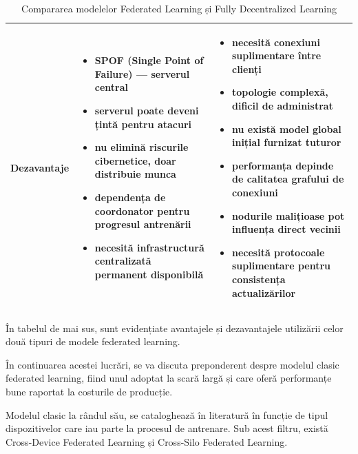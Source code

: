 \documentclass[../../main.tex]{subfiles}
\begin{document}
\begin{table}[h]
\begin{tabular}{ | p{} | p{} | p{} | }
        \textbf{Dezavantaje}
        &
        \begin{itemize}[noitemsep, topsep=2pt, leftmargin=*]
            \item SPOF (Single Point of Failure) --- serverul central
            \item serverul poate deveni țintă pentru atacuri
            \item nu elimină riscurile cibernetice, doar distribuie munca
            \item dependența de coordonator pentru progresul antrenării
            \item necesită infrastructură centralizată permanent disponibilă
        \end{itemize}
        &
        \begin{itemize}[noitemsep, topsep=2pt, leftmargin=*]
            \item necesită conexiuni suplimentare între clienți
            \item topologie complexă, dificil de administrat
            \item nu există model global inițial furnizat tuturor
            \item performanța depinde de calitatea grafului de conexiuni
            \item nodurile malițioase pot influența direct vecinii
            \item necesită protocoale suplimentare pentru consistența actualizărilor
        \end{itemize}
        \\
        \hline

    \end{tabular}
    \caption{Compararea modelelor Federated Learning și Fully Decentralized Learning}
    \label{tab:fl_vs_p2p}
\end{table}
    
În tabelul de mai sus, sunt evidențiate avantajele și dezavantajele utilizării celor două tipuri de modele federated learning.

În continuarea acestei lucrări, se va discuta preponderent despre modelul clasic federated learning, fiind unul adoptat la scară largă și care oferă performanțe bune raportat la costurile de producție.

Modelul clasic la rândul său, se cataloghează în literatură în funcție de tipul dispozitivelor care iau parte la procesul de antrenare. Sub acest filtru, există Cross-Device Federated Learning și Cross-Silo Federated Learning.
\end{document}
